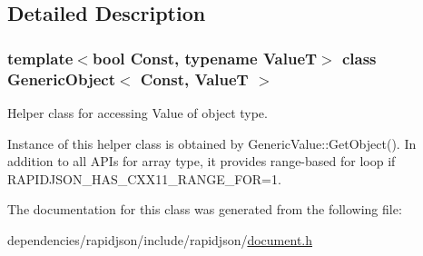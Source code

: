 \subsection{Detailed Description}
\subsubsection*{template$<$bool Const, typename ValueT$>$\newline
class Generic\+Object$<$ Const, Value\+T $>$}

Helper class for accessing Value of object type. 

Instance of this helper class is obtained by {\ttfamily Generic\+Value\+::\+Get\+Object()}. In addition to all A\+P\+Is for array type, it provides range-\/based for loop if {\ttfamily R\+A\+P\+I\+D\+J\+S\+O\+N\+\_\+\+H\+A\+S\+\_\+\+C\+X\+X11\+\_\+\+R\+A\+N\+G\+E\+\_\+\+F\+OR=1}. 

The documentation for this class was generated from the following file\+:\begin{DoxyCompactItemize}
\item 
dependencies/rapidjson/include/rapidjson/\hyperlink{document_8h}{document.\+h}\end{DoxyCompactItemize}
